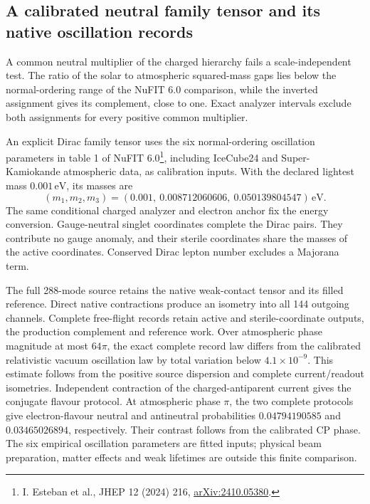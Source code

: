\subsection{A calibrated neutral family tensor and its native oscillation records}
A common neutral multiplier of the charged hierarchy fails a scale-independent test. The ratio of the solar to atmospheric squared-mass gaps lies below the normal-ordering range of the NuFIT 6.0 comparison, while the inverted assignment gives its complement, close to one. Exact analyzer intervals exclude both assignments for every positive common multiplier.

An explicit Dirac family tensor uses the six normal-ordering oscillation parameters in table 1 of NuFIT 6.0\footnote{I. Esteban et al., JHEP 12 (2024) 216, \href{https://arxiv.org/abs/2410.05380}{arXiv:2410.05380}.}, including IceCube24 and Super-Kamiokande atmospheric data, as calibration inputs. With the declared lightest mass $0.001\,\mathrm{eV}$, its masses are
\[
(m_1,m_2,m_3)=(0.001,\ 0.008712060606,\ 0.050139804547)\,\mathrm{eV}.
\]
The same conditional charged analyzer and electron anchor fix the energy conversion. Gauge-neutral singlet coordinates complete the Dirac pairs. They contribute no gauge anomaly, and their sterile coordinates share the masses of the active coordinates. Conserved Dirac lepton number excludes a Majorana term.

The full 288-mode source retains the native weak-contact tensor and its filled reference. Direct native contractions produce an isometry into all 144 outgoing channels. Complete free-flight records retain active and sterile-coordinate outputs, the production complement and reference work. Over atmospheric phase magnitude at most $64\pi$, the exact complete record law differs from the calibrated relativistic vacuum oscillation law by total variation below $4.1\times10^{-9}$. This estimate follows from the positive source dispersion and complete current/readout isometries. Independent contraction of the charged-antiparent current gives the conjugate flavour protocol. At atmospheric phase $\pi$, the two complete protocols give electron-flavour neutral and antineutral probabilities $0.04794190585$ and $0.03465026894$, respectively. Their contrast follows from the calibrated CP phase. The six empirical oscillation parameters are fitted inputs; physical beam preparation, matter effects and weak lifetimes are outside this finite comparison.

